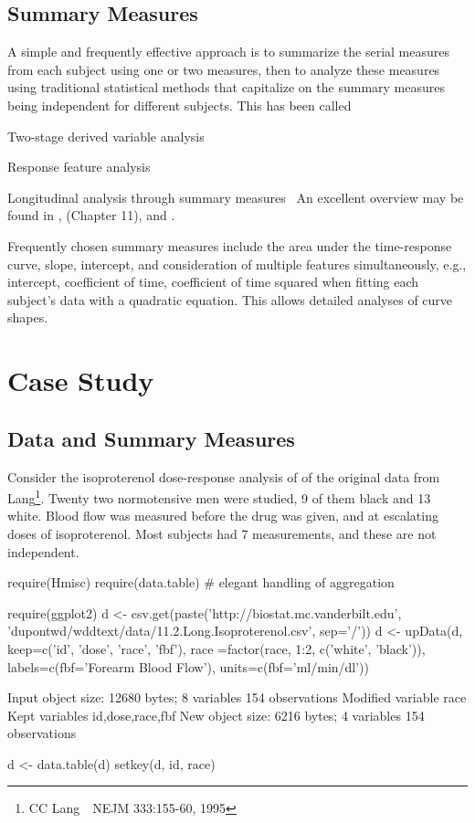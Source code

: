 \subsection{Summary Measures}\ipacue
A simple and frequently effective approach is to summarize the serial
measures from each subject using one or two measures, then to analyze
these measures using traditional statistical methods that capitalize
on the summary measures being independent for different subjects.
This has been called
\be
\item Two-stage derived variable analysis~\cite{diggle-longit}
\item Response feature analysis~\cite{dupmod}
\item Longitudinal analysis through summary measures~\cite{mat90ana}
\ee
An excellent overview may be found in \citet{mat90ana},
\citet{dupmod} (Chapter 11), and \citet{sen00rep}.

Frequently chosen summary measures include the area under the
time-response curve, slope, intercept, and consideration of multiple
features simultaneously, e.g., intercept, coefficient of time,
coefficient of time squared when fitting each subject's data with a
quadratic equation.  This allows detailed analyses of curve shapes.

\section{Case Study}
\subsection{Data and Summary Measures}\ipacue
Consider the isoproterenol dose-response analysis of \citet{dupmod} of
the original data from Lang\footnote{CC Lang~\etal\ NEJM
  333:155-60, 1995}.  Twenty two normotensive men were studied, 9 of
them black and 13 white.  Blood flow was measured before the drug was
given, and at escalating doses of isoproterenol.  Most subjects had 7
measurements, and these are not independent.
\begin{Schunk}
\begin{Sinput}
require(Hmisc)
require(data.table)   # elegant handling of aggregation
\end{Sinput}
\begin{Sinput}
require(ggplot2)
d <- csv.get(paste('http://biostat.mc.vanderbilt.edu',
                   'dupontwd/wddtext/data/11.2.Long.Isoproterenol.csv',
                   sep='/'))
d <- upData(d, keep=c('id', 'dose', 'race', 'fbf'),
            race  =factor(race, 1:2, c('white', 'black')),
            labels=c(fbf='Forearm Blood Flow'),
            units=c(fbf='ml/min/dl'))
\end{Sinput}
\begin{Soutput}
Input object size:	 12680 bytes;	 8 variables	 154 observations
Modified variable	 race 
Kept variables	 id,dose,race,fbf 
New object size:	 6216 bytes;	 4 variables	 154 observations
\end{Soutput}
\begin{Sinput}
d <- data.table(d)
setkey(d, id, race)
\end{Sinput}
\end{Schunk}

